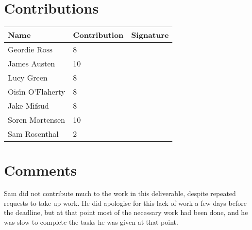 \documentclass[12pt]{article}
\begin{document}
\maketitle
\thispagestyle{empty}

\section*{Contributions}

\begin{center}
  \begin{tabular}{llp{5cm}}
    Name & Contribution & Signature \\
    \midrule
    Geordie Ross & 8 & \\
    James Austen & 10 & \\
    Lucy Green & 8 & \\
    Ois{\'\i}n O'Flaherty & 8 & \\
    Jake Mifsud & 8 & \\
    Soren Mortensen & 10 & \\
    Sam Rosenthal & 2 & \\
  \end{tabular}
\end{center}

\section*{Comments}

Sam did not contribute much to the work in this deliverable, despite repeated requests to take up 
work. He did apologise for this lack of work a few days before the deadline, but at that point most 
of the necessary work had been done, and he was slow to complete the tasks he was given at that 
point.
\end{document}
